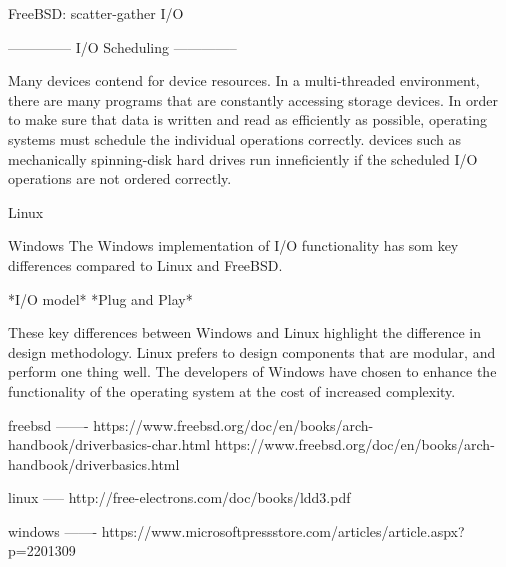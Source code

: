 FreeBSD: scatter-gather I/O 

--------------
I/O Scheduling
--------------

Many devices contend for device resources.  In a multi-threaded environment, there are many programs that are constantly accessing storage devices.  In order to make sure that data is written and read as efficiently as possible, operating systems must schedule the individual operations correctly.  devices such as mechanically spinning-disk hard drives run inneficiently if the scheduled I/O operations are not ordered correctly.

Linux


Windows
  The Windows implementation of I/O functionality has som key differences compared to Linux and FreeBSD.

  *I/O model*
  *Plug and Play*

These key differences between Windows and Linux highlight the difference in design methodology.  Linux prefers to design components that are modular, and perform one thing well.  The developers of Windows have chosen to enhance the functionality of the operating system at the cost of increased complexity.

freebsd
-------
https://www.freebsd.org/doc/en/books/arch-handbook/driverbasics-char.html
https://www.freebsd.org/doc/en/books/arch-handbook/driverbasics.html


linux
-----
http://free-electrons.com/doc/books/ldd3.pdf

windows
-------
https://www.microsoftpressstore.com/articles/article.aspx?p=2201309
